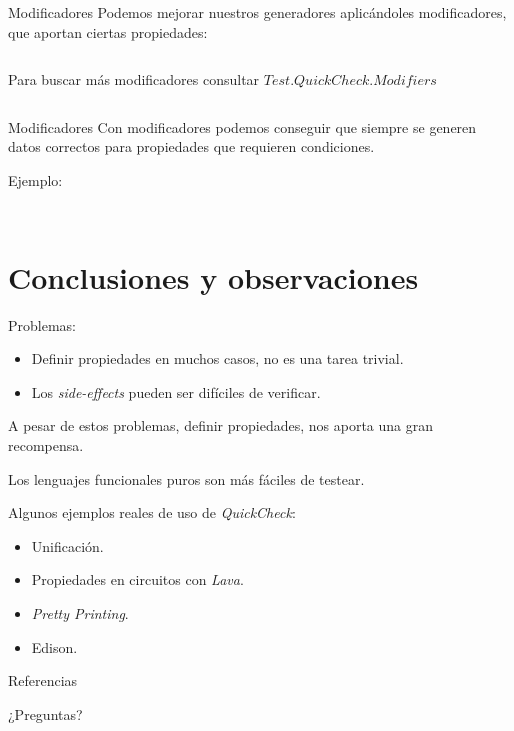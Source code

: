 \documentclass[10pt]{beamer}
\newcommand\Fontvi{\fontsize{10}{12}\selectfont}
\begin{document}
\begin{frame}{Modificadores}
  Podemos mejorar nuestros generadores aplicándoles modificadores, que
  aportan ciertas propiedades:

  \inputminted{haskell}{data/modificadores.hs}

  Para buscar más modificadores consultar $Test.QuickCheck.Modifiers$
\end{frame}

\begin{frame}[standout]
  \Fontvi
  \inputminted{text}{data/modificadores_prueba.txt}
\end{frame}

\begin{frame}{Modificadores}
  Con modificadores podemos conseguir que siempre se generen datos
  correctos para propiedades que requieren condiciones.

  Ejemplo:
  \inputminted{haskell}{data/modificadores2.hs}
\end{frame}

\begin{frame}[standout]
  \Fontvi
  \inputminted{text}{data/modificadores2_pruebas.txt}
\end{frame}

\section{Conclusiones y observaciones}

\begin{frame}
  Problemas:
  \begin{itemize}
  \item Definir propiedades en muchos casos, no es una tarea trivial.
  \item Los \textit{side-effects} pueden ser difíciles de verificar.
  \end{itemize}
  A pesar de estos problemas, definir propiedades, nos aporta una gran
  recompensa.

  Los lenguajes funcionales puros son más fáciles de testear.

  Algunos ejemplos reales de uso de \textit{QuickCheck}:
  \begin{itemize}
  \item Unificación.
  \item Propiedades en circuitos con \textit{Lava}.
  \item \textit{Pretty Printing}.
  \item Edison.
  \end{itemize}
\end{frame}

\appendix

\begin{frame}{Referencias}

  
  

\end{frame}

\begin{frame}[standout]
  ¿Preguntas?
\end{frame}
\end{document}
